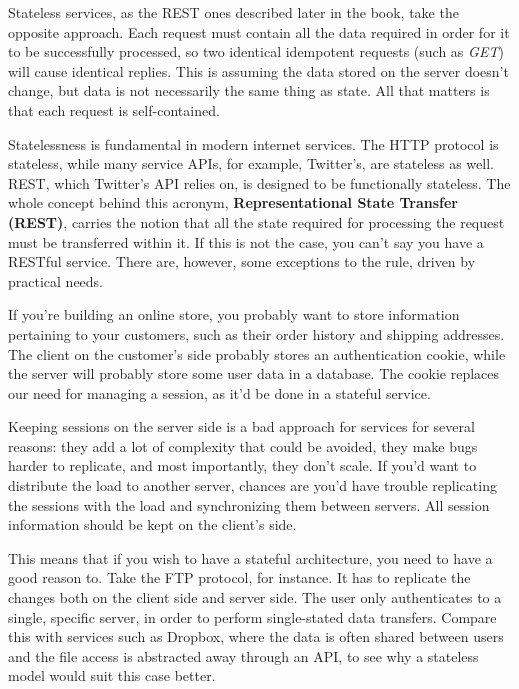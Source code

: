 Stateless services, as the REST ones described later in the book, take the opposite approach. Each request must contain all the data required in order for it to be successfully processed, so two identical idempotent requests (such as \textit{GET}) will cause identical replies. This is assuming the data stored on the server doesn't change, but data is not necessarily the same thing as state. All that matters is that each request is self-contained.

Statelessness is fundamental in modern internet services. The HTTP protocol is stateless, while many service APIs, for example, Twitter's, are stateless as well. REST, which Twitter's API relies on, is designed to be functionally stateless. The whole concept behind this acronym, \textbf{Representational State Transfer (REST)}, carries the notion that all the state required for processing the request must be transferred within it. If this is not the case, you can't say you have a RESTful service. There are, however, some exceptions to the rule, driven by practical needs.

If you're building an online store, you probably want to store information pertaining to your customers, such as their order history and shipping addresses. The client on the customer's side probably stores an authentication cookie, while the server will probably store some user data in a database. The cookie replaces our need for managing a session, as it'd be done in a stateful service.

Keeping sessions on the server side is a bad approach for services for several reasons: they add a lot of complexity that could be avoided, they make bugs harder to replicate, and most importantly, they don't scale. If you'd want to distribute the load to another server, chances are you'd have trouble replicating the sessions with the load and synchronizing them between servers. All session information should be kept on the client's side.

This means that if you wish to have a stateful architecture, you need to have a good reason to. Take the FTP protocol, for instance. It has to replicate the changes both on the client side and server side. The user only authenticates to a single, specific server, in order to perform single-stated data transfers. Compare this with services such as Dropbox, where the data is often shared between users and the file access is abstracted away through an API, to see why a stateless model would suit this case better.













